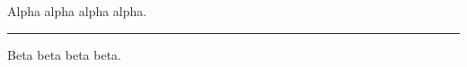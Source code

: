 \documentclass[11pt]{article}
\newcommand{\cvsection}[1]{\vspace{6pt}{\large\bfseries #1}\\[-6pt]\rule{\textwidth}{0.6pt}\vspace{2pt}}
\begin{document}
Alpha alpha alpha alpha.
\cvsection{Education}
Beta beta beta beta.
\end{document}
